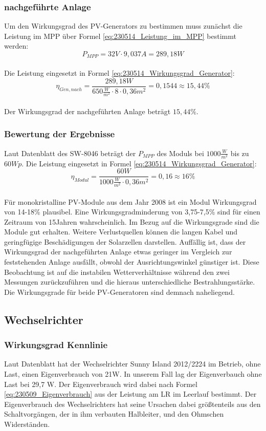 \subsubsection{nachgeführte Anlage}
Um den Wirkungsgrad des PV-Generators zu bestimmen muss zunächst die Leistung im MPP über Formel \autoref{eq:230514_Leistung_im_MPP} bestimmt werden:
\\
$$P_{MPP} = 32V \cdot 9,037A = 289,18W$$ \\
Die Leistung eingesetzt in Formel \autoref{eq:230514_Wirkungsgrad_Generator}:\\
$$\eta_{Gen,nach}=\frac{289,18W}{650\frac{W}{m^2}\cdot 8\cdot 0,36 m^2}
=0,1544\approx 15,44\%$$\\
Der Wirkungsgrad der nachgeführten Anlage beträgt $15,44\%$.
\subsubsection{Bewertung der Ergebnisse}

Laut Datenblatt des SW-8046 beträgt der $P_{MPP}$ des Moduls bei $1000\frac{W}{m^2}$ bis zu $60Wp$.
Die Leistung eingesetzt in Formel \autoref{eq:230514_Wirkungsgrad_Generator}:\\
$$\eta_{Modul}=\frac{60W}{1000\frac{W}{m^2}\cdot 0,36 m^2}
=0,16\approx 16\%$$\\
Für monokristalline PV-Module aus dem Jahr 2008 ist ein Modul Wirkungsgrad von 14-18\% plausibel. Eine Wirkungsgradminderung von 3,75-7,5\% sind für einen Zeitraum von 15Jahren wahrscheinlich. Im Bezug auf die Wirkungsgrade sind die Module gut erhalten. Weitere Verlustquellen können die langen Kabel und geringfügige Beschädigungen der Solarzellen darstellen. Auffällig ist, dass der Wirkungsgrad der nachgeführten Anlage etwas geringer im Vergleich zur feststehenden Anlage ausfällt, obwohl der Ausrichtungswinkel günstiger ist. Diese Beobachtung ist auf die instabilen Wetterverhältnisse während den zwei Messungen zurückzuführen und die hieraus unterschiedliche Bestrahlungsstärke.
Die Wirkungsgrade für beide PV-Generatoren sind demnach naheliegend.


\subsection{Wechselrichter}
\subsubsection{Wirkungsgrad Kennlinie}
Laut Datenblatt hat der Wechselrichter Sunny Island 2012/2224 im Betrieb, ohne Last, einen Eigenverbrauch von 21W. 
In unserem Fall lag der Eigenverbauch ohne Last bei 29,7 W. 
Der Eigenverbrauch wird dabei nach Formel \autoref{eq:230509_Eigenverbrauch} aus der Leistung am LR im Leerlauf bestimmt. 
Der Eigenverbrauch des Wechselrichters hat seine Ursachen dabei größtenteils aus den Schaltvorgängen, der in ihm verbauten Halbleiter, und den Ohmschen Widerständen.

